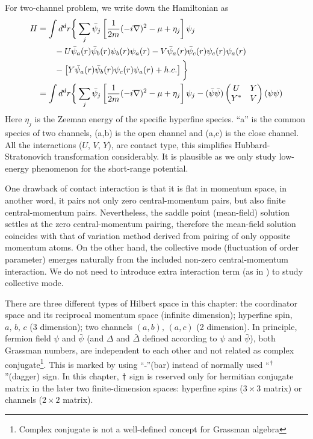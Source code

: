 For two-channel problem, we write down the Hamiltonian as
\begin{equation}\label{eq:pathInt2:ham2}
\begin{split}
H&=\int{d^{d}r}\bigg\{\sum_{j}\bar\psi_{j}\left[\frac{1}{2m}(-i\nabla)^{2}-\mu+\eta_{j}\right]\psi_{j}\\
	&\qquad-U\bar\psi_{a}(r)\bar\psi_{b}(r)\psi_{b}(r)\psi_{a}(r)-V\bar\psi_{a}(r)\bar\psi_{c}(r)\psi_{c}(r)\psi_{a}(r)\\
	&\qquad-\left[Y\bar\psi_{a}(r)\bar\psi_{b}(r)\psi_{c}(r)\psi_{a}(r)+h.c.\right]
	\bigg\}\\
 &=\int{d^{d}r}\bigg\{\sum_{j}\bar\psi_{j}\left[\frac{1}{2m}(-i\nabla)^{2}-\mu+\eta_{j}\right]\psi_{j}
 	-(\bar\psi\bar\psi)\begin{pmatrix}U&Y\\Y^{*}&V\end{pmatrix}(\psi\psi)
\end{split}
\end{equation}
Here $\eta_{j}$ is the Zeeman energy of the specific hyperfine species.  ``a'' is the common species of two channels, (a,b) is the open channel and (a,c) is the close channel.  All the interactions ($U$, $V$, $Y$), are contact type, this simplifies Hubbard-Stratonovich transformation considerably.  It is plausible as we only study low-energy phenomenon for the short-range potential. 

One drawback of contact interaction is that it is flat in momentum space, in another word, it pairs not only zero central-momentum pairs, but also finite central-momentum pairs.  Nevertheless, the saddle point (mean-field) solution settles at the zero central-momentum pairing, therefore the mean-field solution coincides with that of  variation method derived from pairing of only opposite momentum atoms.  On the other hand, the collective mode (fluctuation of order parameter) emerges naturally from the included non-zero central-momentum interaction.  We do not need to introduce extra interaction term (as in \cite{AndersonBCS}) to study collective mode.   

There are three different types of Hilbert space in this chapter:  the coordinator space and its reciprocal momentum space (infinite dimension);   hyperfine spin, $a,\,b,\,c$ (3 dimension);  two channels $(a,b),\,(a,c)$ (2 dimension).  In principle, fermion field $\psi$ and $\bar\psi$ (and $\Delta$ and $\bar\Delta$ defined according to $\psi$ and $\bar\psi$),  both Grassman numbers, are independent to each other  and  not related as complex conjugate\footnote{Complex conjugate is not a well-defined concept for Grassman algebra}.  This is marked by using ``$\bar{\;}$''(bar) instead of normally used ``$^{\dagger}$''(dagger) sign. In this chapter, $^{}\dagger$ sign is reserved only for hermitian conjugate matrix in the later two finite-dimension spaces: hyperfine spins ($3\times3$ matrix) or channels ($2\times2$ matrix). 

